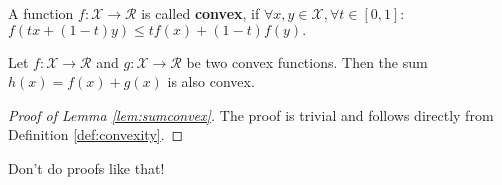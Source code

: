 \begin{definition}[Convexity]
A function $f:\mathcal{X}\to\mathcal{R}$ is called \textbf{convex}, if $\forall x, y\in\mathcal{X}, \forall t\in[0,1]:$ 
$f(tx+(1-t)y)\leq tf(x) + (1-t)f(y).$
\label{def:convexity}
\end{definition}
\begin{lemma}
Let $f:\mathcal{X}\to\mathcal{R}$ and $g:\mathcal{X}\to\mathcal{R}$ be two convex functions. Then the sum $h(x) = f(x)+g(x)$ is also convex.
\label{lem:sumconvex}
\end{lemma}
\begin{proof}[Proof of Lemma \ref{lem:sumconvex}]
The proof is trivial and follows directly from Definition \ref{def:convexity}. \qedhere
\end{proof}
\begin{remark}
Don't do proofs like that!
\end{remark}
